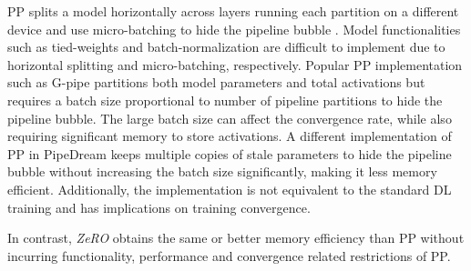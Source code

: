 \documentclass{article}
\newcommand{\name}{\emph{ZeRO}\xspace}
\begin{document}
PP splits a model horizontally across layers running each partition on a different device and use micro-batching to hide the pipeline bubble \cite{GPipe,DBLP:journals/corr/pipedream}. Model functionalities such as tied-weights and batch-normalization are difficult to implement due to horizontal splitting and micro-batching, respectively. Popular PP implementation such as G-pipe \cite{GPipe} partitions both model parameters and total activations but requires a batch size proportional to number of pipeline partitions to hide the pipeline bubble. The large batch size can affect the convergence rate, while also requiring significant memory to store activations. A different implementation of PP in PipeDream \cite{narayanan2019pipedream} keeps multiple copies of stale parameters to hide the pipeline bubble without increasing the batch size significantly, making it less memory efficient. Additionally, the implementation is not equivalent to the standard DL training and has implications on training convergence. 

In contrast, \name obtains the same or better memory efficiency than PP without incurring functionality, performance and convergence related restrictions of PP.

\end{document}
